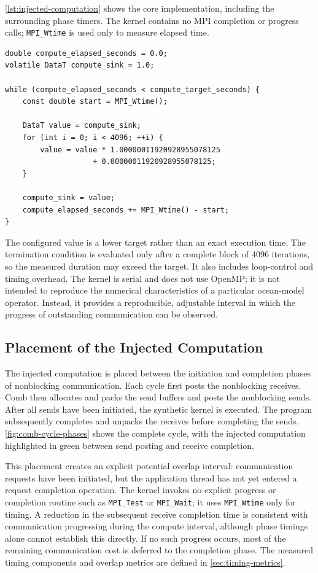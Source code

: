 \autoref{lst:injected-computation} shows the core implementation, including
the surrounding phase timers. The kernel contains no MPI completion or
progress calls; \texttt{MPI\_Wtime} is used only to measure elapsed time.

\begin{lstlisting}[basicstyle=\ttfamily\footnotesize,
  breaklines=true,
  caption={Time-controlled synthetic computation kernel used in Comb.},
  label={lst:injected-computation}]
double compute_elapsed_seconds = 0.0;
volatile DataT compute_sink = 1.0;

while (compute_elapsed_seconds < compute_target_seconds) {
    const double start = MPI_Wtime();

    DataT value = compute_sink;
    for (int i = 0; i < 4096; ++i) {
        value = value * 1.00000011920928955078125
                    + 0.00000011920928955078125;
    }

    compute_sink = value;
    compute_elapsed_seconds += MPI_Wtime() - start;
}
\end{lstlisting}

The configured value is a lower target rather than an exact execution time.
The termination condition is evaluated only after a complete block of 4096
iterations, so the measured duration may exceed the target. It also includes
loop-control and timing overhead. The kernel is serial and does not use OpenMP;
it is not intended to reproduce the numerical characteristics of a particular
ocean-model operator. Instead, it provides a reproducible, adjustable interval
in which the progress of outstanding communication can be observed.

\subsection{Placement of the Injected Computation}

The injected computation is placed between the initiation and completion
phases of nonblocking communication. Each cycle first posts the nonblocking
receives. Comb then allocates and packs the send buffers and posts the
nonblocking sends. After all sends have been initiated, the synthetic kernel is
executed. The program subsequently completes and unpacks the receives before
completing the sends. \autoref{fig:comb-cycle-phases} shows the complete
cycle, with the injected computation highlighted in green between send
posting and receive completion.

This placement creates an explicit potential overlap interval: communication
requests have been initiated, but the application thread has not yet entered a
request completion operation. The kernel invokes no explicit progress or
completion routine such as \texttt{MPI\_Test} or \texttt{MPI\_Wait}; it uses
\texttt{MPI\_Wtime} only for timing. A reduction in the subsequent receive
completion time is consistent with communication progressing during the compute
interval, although phase timings alone cannot establish this directly. If no
such progress occurs, most of the remaining
communication cost is deferred to the completion phase. The measured timing
components and overlap metrics are defined in \autoref{sec:timing-metrics}.


